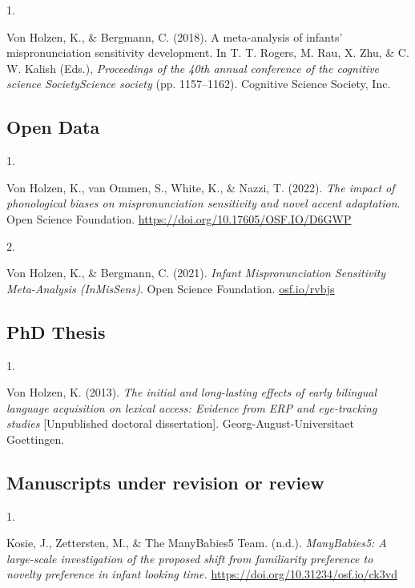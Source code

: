 \documentclass[10pt,a4paper,]{article}
\newlength{\cslhangindent}
\newlength{\csllabelwidth}
\newcommand{\CSLLeftMargin}[1]{\parbox[t]{\csllabelwidth}{\hfill #1~}}
\newcommand{\CSLRightInline}[1]{\parbox[t]{\linewidth - \cslhangindent - \csllabelwidth}{#1}\vspace{0.8ex}}
\begin{document}
\hypertarget{bibliography}{}
\leavevmode{}%
\CSLLeftMargin{1. }%
\CSLRightInline{Von Holzen, K., \& Bergmann, C. (2018). A meta-analysis
of infants' mispronunciation sensitivity development. In T. T. Rogers,
M. Rau, X. Zhu, \& C. W. Kalish (Eds.), \emph{Proceedings of the 40th
annual conference of the cognitive science SocietyScience society} (pp.
1157--1162). Cognitive Science Society, Inc.}

\hypertarget{open-data}{%
\subsection{Open Data}\label{open-data}}

\hypertarget{bibliography}{}
\leavevmode{}%
\CSLLeftMargin{1. }%
\CSLRightInline{Von Holzen, K., van Ommen, S., White, K., \& Nazzi, T.
(2022). \emph{The impact of phonological biases on mispronunciation
sensitivity and novel accent adaptation}. Open Science Foundation.
\url{https://doi.org/10.17605/OSF.IO/D6GWP}}

\leavevmode{}%
\CSLLeftMargin{2. }%
\CSLRightInline{Von Holzen, K., \& Bergmann, C. (2021). \emph{Infant
Mispronunciation Sensitivity Meta-Analysis (InMisSens)}. Open Science
Foundation. \href{https://osf.io/rvbjs}{osf.io/rvbjs}}

\hypertarget{phd-thesis}{%
\subsection{PhD Thesis}\label{phd-thesis}}

\hypertarget{bibliography}{}
\leavevmode{}%
\CSLLeftMargin{1. }%
\CSLRightInline{Von Holzen, K. (2013). \emph{The initial and
long-lasting effects of early bilingual language acquisition on lexical
access: Evidence from ERP and eye-tracking studies} {[}Unpublished
doctoral dissertation{]}. Georg-August-Universitaet Goettingen.}

\hypertarget{manuscripts-under-revision-or-review}{%
\subsection{Manuscripts under revision or
review}\label{manuscripts-under-revision-or-review}}

\hypertarget{bibliography}{}
\leavevmode{}%
\CSLLeftMargin{1. }%
\CSLRightInline{Kosie, J., Zettersten, M., \& The ManyBabies5 Team.
(n.d.). \emph{ManyBabies5: A large-scale investigation of the proposed
shift from familiarity preference to novelty preference in infant
looking time.} \url{https://doi.org/10.31234/osf.io/ck3vd}}
\end{document}

